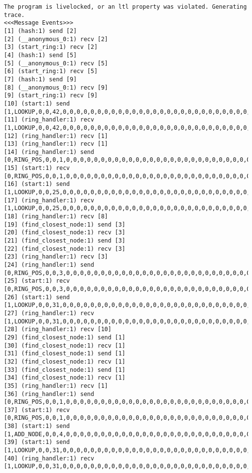 \begin{lstlisting}[xleftmargin=.01\linewidth, xrightmargin=0.01\linewidth, caption={Message passing caused by the proposer's protocol bug.}, label={lst:paxos_bug}]
The program is livelocked, or an ltl property was violated. Generating trace.
<<<Message Events>>>
[1] (hash:1) send [2]
[2] (__anonymous_0:1) recv [2]
[3] (start_ring:1) recv [2]
[4] (hash:1) send [5]
[5] (__anonymous_0:1) recv [5]
[6] (start_ring:1) recv [5]
[7] (hash:1) send [9]
[8] (__anonymous_0:1) recv [9]
[9] (start_ring:1) recv [9]
[10] (start:1) send [1,LOOKUP,0,0,42,0,0,0,0,0,0,0,0,0,0,0,0,0,0,0,0,0,0,0,0,0,0,0,0,0,0,0,0,0,0,0,0,0]
[11] (ring_handler:1) recv [1,LOOKUP,0,0,42,0,0,0,0,0,0,0,0,0,0,0,0,0,0,0,0,0,0,0,0,0,0,0,0,0,0,0,0,0,0,0,0,0]
[12] (ring_handler:1) recv [1]
[13] (ring_handler:1) recv [1]
[14] (ring_handler:1) send [0,RING_POS,0,0,1,0,0,0,0,0,0,0,0,0,0,0,0,0,0,0,0,0,0,0,0,0,0,0,0,0,0,0,0,0,0,0,0,0]
[15] (start:1) recv [0,RING_POS,0,0,1,0,0,0,0,0,0,0,0,0,0,0,0,0,0,0,0,0,0,0,0,0,0,0,0,0,0,0,0,0,0,0,0,0]
[16] (start:1) send [1,LOOKUP,0,0,25,0,0,0,0,0,0,0,0,0,0,0,0,0,0,0,0,0,0,0,0,0,0,0,0,0,0,0,0,0,0,0,0,0]
[17] (ring_handler:1) recv [1,LOOKUP,0,0,25,0,0,0,0,0,0,0,0,0,0,0,0,0,0,0,0,0,0,0,0,0,0,0,0,0,0,0,0,0,0,0,0,0]
[18] (ring_handler:1) recv [8]
[19] (find_closest_node:1) send [3]
[20] (find_closest_node:1) recv [3]
[21] (find_closest_node:1) send [3]
[22] (find_closest_node:1) recv [3]
[23] (ring_handler:1) recv [3]
[24] (ring_handler:1) send [0,RING_POS,0,0,3,0,0,0,0,0,0,0,0,0,0,0,0,0,0,0,0,0,0,0,0,0,0,0,0,0,0,0,0,0,0,0,0,0]
[25] (start:1) recv [0,RING_POS,0,0,3,0,0,0,0,0,0,0,0,0,0,0,0,0,0,0,0,0,0,0,0,0,0,0,0,0,0,0,0,0,0,0,0,0]
[26] (start:1) send [1,LOOKUP,0,0,31,0,0,0,0,0,0,0,0,0,0,0,0,0,0,0,0,0,0,0,0,0,0,0,0,0,0,0,0,0,0,0,0,0]
[27] (ring_handler:1) recv [1,LOOKUP,0,0,31,0,0,0,0,0,0,0,0,0,0,0,0,0,0,0,0,0,0,0,0,0,0,0,0,0,0,0,0,0,0,0,0,0]
[28] (ring_handler:1) recv [10]
[29] (find_closest_node:1) send [1]
[30] (find_closest_node:1) recv [1]
[31] (find_closest_node:1) send [1]
[32] (find_closest_node:1) recv [1]
[33] (find_closest_node:1) send [1]
[34] (find_closest_node:1) recv [1]
[35] (ring_handler:1) recv [1]
[36] (ring_handler:1) send [0,RING_POS,0,0,1,0,0,0,0,0,0,0,0,0,0,0,0,0,0,0,0,0,0,0,0,0,0,0,0,0,0,0,0,0,0,0,0,0]
[37] (start:1) recv [0,RING_POS,0,0,1,0,0,0,0,0,0,0,0,0,0,0,0,0,0,0,0,0,0,0,0,0,0,0,0,0,0,0,0,0,0,0,0,0]
[38] (start:1) send [1,ADD_NODE,0,0,4,0,0,0,0,0,0,0,0,0,0,0,0,0,0,0,0,0,0,0,0,0,0,0,0,0,0,0,0,0,0,0,0,0]
[39] (start:1) send [1,LOOKUP,0,0,31,0,0,0,0,0,0,0,0,0,0,0,0,0,0,0,0,0,0,0,0,0,0,0,0,0,0,0,0,0,0,0,0,0]
[40] (ring_handler:1) recv [1,LOOKUP,0,0,31,0,0,0,0,0,0,0,0,0,0,0,0,0,0,0,0,0,0,0,0,0,0,0,0,0,0,0,0,0,0,0,0,0]

\end{lstlisting}
